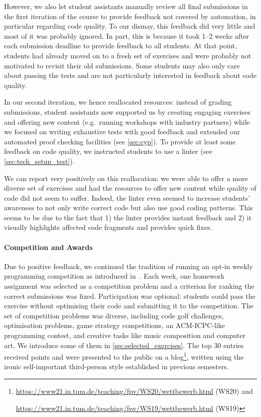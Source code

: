 However, we also let student assistants manually review all final submissions
in the first iteration of the course
to provide feedback not covered by automation,
in particular regarding code quality.
To our dismay, this feedback did very little and
most of it was probably ignored.
In part, this is because it took 1--2 weeks after each submission deadline to provide feedback to all students.
At that point, students had already moved on to a fresh set of exercises and were probably not motivated to revisit their old submissions.
Some students may also only care about passing the tests
and are not particularly interested in feedback about code quality.

In our second iteration, we hence reallocated resources:
instead of grading submissions,
student assistants now supported us by creating engaging exercises
and offering new content (e.g.\ running workshops with industry partners)
while we focused on writing exhaustive tests with good feedback and extended our automated proof checking facilities (see \cref{sec:cyp}).
To provide at least some feedback on
code quality, we instructed students
to use a linter (see \cref{sec:tech_setup_test}).

We can report very positively on this reallocation:
we were able to offer a more diverse set of exercises and
had the resources to offer new content
while quality of code did not seem to suffer.
Indeed, the linter even seemed to increase students' awareness
to not only write correct code but also use good coding patterns.
This seems to be due to the fact that 1) the linter provides instant feedback and 2) it visually highlights affected code fragments and provides quick fixes.

\paragraph{Competition and Awards}

Due to positive feedback,
we continued the tradition of running an opt-in weekly
programming competition as introduced in~\cite{next_1100}.
Each week, one homework assignment
was selected as a competition problem
and a criterion for ranking the correct submissions was fixed.
Participation was optional:
students could pass the exercise without optimising their code and submitting it to the competition.
The set of competition problems was diverse,
including code golf challenges,
optimisation problems,
game strategy competitions,
an ACM-ICPC-like programming contest,
and creative tasks like music composition
and computer art.
We introduce some of them in \cref{sec:selected_exercises}.
The top 30 entries received points
and were presented to the public on a blog\footnote{\url{https://www21.in.tum.de/teaching/fpv/WS20/wettbewerb.html} (WS20) and

\url{https://www21.in.tum.de/teaching/fpv/WS19/wettbewerb.html} (WS19)},
written using the ironic self-important third-person style established in previous semesters.

